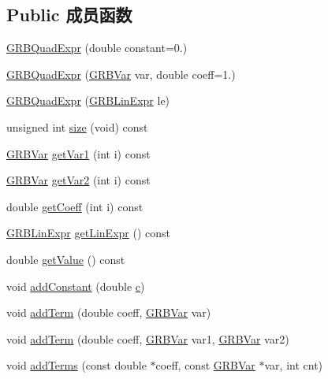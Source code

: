 \subsection*{Public 成员函数}
\begin{DoxyCompactItemize}
\item 
\hyperlink{classGRBQuadExpr_a43fa63987ac20f99ef122955b6ede096}{G\+R\+B\+Quad\+Expr} (double constant=0.)
\item 
\hyperlink{classGRBQuadExpr_a3ecdf9ca3557a24525052867fc2c8f8b}{G\+R\+B\+Quad\+Expr} (\hyperlink{classGRBVar}{G\+R\+B\+Var} var, double coeff=1.)
\item 
\hyperlink{classGRBQuadExpr_ab093b03a58f322abb0f40ccbdbe4805f}{G\+R\+B\+Quad\+Expr} (\hyperlink{classGRBLinExpr}{G\+R\+B\+Lin\+Expr} le)
\item 
unsigned int \hyperlink{classGRBQuadExpr_a08a8a51e2a8c717cb9e59c98a5e457d9}{size} (void) const 
\item 
\hyperlink{classGRBVar}{G\+R\+B\+Var} \hyperlink{classGRBQuadExpr_afdfbcdd9eddea5f9edd11194340c1160}{get\+Var1} (int i) const 
\item 
\hyperlink{classGRBVar}{G\+R\+B\+Var} \hyperlink{classGRBQuadExpr_a8add7ef778921b5b1313be1ec922fe14}{get\+Var2} (int i) const 
\item 
double \hyperlink{classGRBQuadExpr_ad23aedddc02ca8de6cf8844ce7e29f7d}{get\+Coeff} (int i) const 
\item 
\hyperlink{classGRBLinExpr}{G\+R\+B\+Lin\+Expr} \hyperlink{classGRBQuadExpr_ac5d385d68bc55c9e5f2268e9f002597f}{get\+Lin\+Expr} () const 
\item 
double \hyperlink{classGRBQuadExpr_ac7541e6b49aa38df71ff29b86b2514d2}{get\+Value} () const 
\item 
void \hyperlink{classGRBQuadExpr_adff49561f4598a301c077c848d13b415}{add\+Constant} (double \hyperlink{IntArray2bmp_8h_ae9d8014c37dbf37873bdee6b8497a065}{c})
\item 
void \hyperlink{classGRBQuadExpr_a3aa68c6db417e3391eee1e364aff8a2f}{add\+Term} (double coeff, \hyperlink{classGRBVar}{G\+R\+B\+Var} var)
\item 
void \hyperlink{classGRBQuadExpr_aa4d8679d1401bff1264d591dd5f856a6}{add\+Term} (double coeff, \hyperlink{classGRBVar}{G\+R\+B\+Var} var1, \hyperlink{classGRBVar}{G\+R\+B\+Var} var2)
\item 
void \hyperlink{classGRBQuadExpr_af3a9b6bccd8445f9adf93348acf73b15}{add\+Terms} (const double $\ast$coeff, const \hyperlink{classGRBVar}{G\+R\+B\+Var} $\ast$var, int cnt)
\item 

\end{DoxyCompactItemize}
